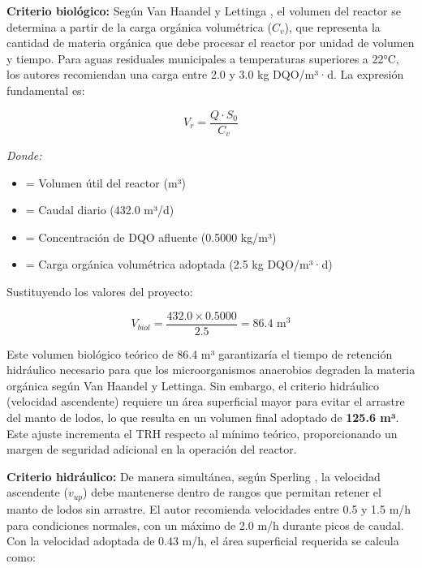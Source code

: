 \documentclass[12pt,a4paper]{article}
\newcommand{\captionequation}[1]{}  %
\begin{document}
\textbf{Criterio biológico:} Según Van Haandel y Lettinga \cite{vanhaandel1994}, el volumen del reactor se determina a partir de la carga orgánica volumétrica ($C_v$), que representa la cantidad de materia orgánica que debe procesar el reactor por unidad de volumen y tiempo. Para aguas residuales municipales a temperaturas superiores a 22°C, los autores recomiendan una carga entre 2.0 y 3.0 kg DQO/m³·d. La expresión fundamental es:

\begin{equation}
V_r = \frac{Q \cdot S_0}{C_v}
\end{equation}
\captionequation{Volumen util del reactor UASB segun Van Haandel y Lettinga (1994)}

\textit{Donde:}
\begin{itemize}[noitemsep,leftmargin=2em]
    \item[$V_r$] = Volumen útil del reactor (m³)
    \item[$Q$] = Caudal diario (432.0 m³/d)
    \item[$S_0$] = Concentración de DQO afluente (0.5000 kg/m³)
    \item[$C_v$] = Carga orgánica volumétrica adoptada (2.5 kg DQO/m³·d)
\end{itemize}

Sustituyendo los valores del proyecto:

\begin{equation}
V_{biol} = \frac{432.0 \times 0.5000}{2.5} = 86.4 \text{ m}^3
\end{equation}

Este volumen biológico teórico de 86.4 m³ garantizaría el tiempo de retención hidráulico necesario para que los microorganismos anaerobios degraden la materia orgánica según Van Haandel y Lettinga. Sin embargo, el criterio hidráulico (velocidad ascendente) requiere un área superficial mayor para evitar el arrastre del manto de lodos, lo que resulta en un volumen final adoptado de \textbf{125.6 m³}. Este ajuste incrementa el TRH respecto al mínimo teórico, proporcionando un margen de seguridad adicional en la operación del reactor.

\textbf{Criterio hidráulico:} De manera simultánea, según Sperling \cite{sperling2007}, la velocidad ascendente ($v_{up}$) debe mantenerse dentro de rangos que permitan retener el manto de lodos sin arrastre. El autor recomienda velocidades entre 0.5 y 1.5 m/h para condiciones normales, con un máximo de 2.0 m/h durante picos de caudal. Con la velocidad adoptada de 0.43 m/h, el área superficial requerida se calcula como:
\end{document}
